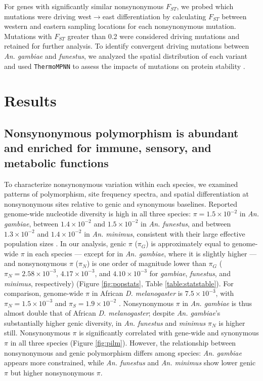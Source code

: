 For genes with significantly similar nonsynonymous $F_{ST}$,
 we probed which mutations were driving west$\rightarrow$east differentiation by 
 calculating $F_{ST}$ between western and eastern sampling locations for each nonsynonymous mutation. 
 Mutations with $F_{ST}$ greater than 0.2 were considered driving 
 mutations and retained for further analysis. To identify convergent driving 
 mutations between \textit{An. gambiae} and \textit{funestus}, 
 we analyzed the spatial distribution of each variant and used 
 \texttt{ThermoMPNN} to assess the impacts of mutations on protein stability \citep{thermompnn}.

\section{Results}

\subsection{Nonsynonymous polymorphism is abundant and enriched for immune, sensory, and metabolic functions}

To characterize nonsynonymous variation within each species,
we examined patterns of polymorphism, site frequency spectra, 
and spatial differentiation at nonsynonymous sites
relative to genic and synonymous baselines.
Reported genome-wide nucleotide diversity is high in all three species:
$\pi =1.5\times10^{-2}$  in \textit{An. gambiae}, between
$1.4\times10^{-2}$ and $1.5\times10^{-2}$ in \textit{An. funestus},
and between $1.3\times10^{-2}$ and $1.4\times10^{-2}$ in \textit{An. minimus},
consistent with their large effective population sizes \citep{gambiae, funestus, minimus}.
In our analysis, genic $\pi$ ($\pi_G$) is approximately equal to genome-wide $\pi$ in each species --- 
except for in \textit{An. gambiae}, where it is slightly higher ---
and nonsynonymous $\pi$ ($\pi_{N}$) is one order of magnitude lower than $\pi_G$
($\pi_{N} =2.58\times10^{-3}$, $4.17\times10^{-3}$,
and $4.10\times10^{-3}$ for \textit{gambiae}, \textit{funestus},
and \textit{minimus}, respectively) (Figure \ref{fig:popstats}, Table \ref{table:statstable}).
For comparison, genome-wide $\pi$ in African \textit{D. melanogaster}
is $7.5\times10^{-3}$,
with $\pi_N = 1.5\times10^{-3}$ and $\pi_S = 1.9\times10^{-2}$ \citep{drosophila}.
Nonsynonymous $\pi$ in \textit{An. gambiae} is thus almost double that of
African \textit{D. melanogaster};
despite \textit{An. gambiae}'s substantially higher genic diversity,
in \textit{An. funestus} and \textit{minimus}
$\pi_{N}$ is higher still.
Nonsynonymous $\pi$ is significantly correlated with gene-wide and synonymous $\pi$
in all three species (Figure \ref{fig:pilm}).
However, the relationship between nonsynonymous and genic polymorphism differs among species:
\textit{An. gambiae} appears more constrained,
while \textit{An. funestus} and \textit{An. minimus} show lower genic $\pi$
but higher nonsynonymous $\pi$.

